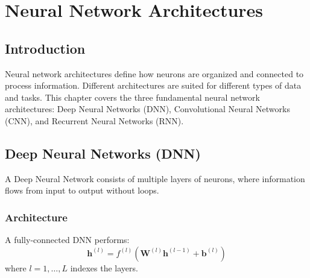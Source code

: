 ﻿\clearpage
\cleardoublepage

\chapter{Neural Network Architectures}

\section{Introduction}

Neural network architectures define how neurons are organized and connected to process information. Different architectures are suited for different types of data and tasks. This chapter covers the three fundamental neural network architectures: Deep Neural Networks (DNN), Convolutional Neural Networks (CNN), and Recurrent Neural Networks (RNN).

\section{Deep Neural Networks (DNN)}

A Deep Neural Network consists of multiple layers of neurons, where information flows from input to output without loops.

\subsection{Architecture}

A fully-connected DNN performs:
\begin{equation}
\mathbf{h}^{(l)} = f^{(l)}(\mathbf{W}^{(l)}\mathbf{h}^{(l-1)} + \mathbf{b}^{(l)})
\end{equation}
where $l = 1, \ldots, L$ indexes the layers.

